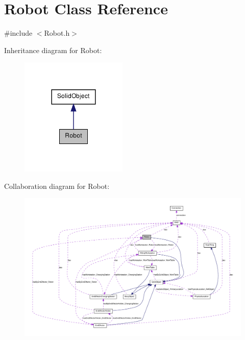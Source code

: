 \hypertarget{class_robot}{
\section{Robot Class Reference}
\label{class_robot}
}


{\ttfamily \#include $<$Robot.h$>$}



Inheritance diagram for Robot:\nopagebreak
\begin{figure}[H]
\begin{center}
\leavevmode
\includegraphics[width=144pt]{class_robot__inherit__graph}
\end{center}
\end{figure}


Collaboration diagram for Robot:\nopagebreak
\begin{figure}[H]
\begin{center}
\leavevmode
\includegraphics[width=400pt]{class_robot__coll__graph}
\end{center}
\end{figure}

